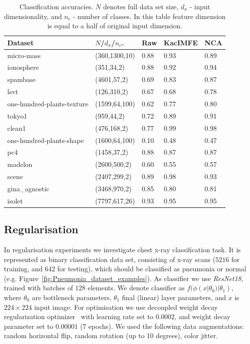 \documentclass{article}
\begin{document}
\begin{table}	
	\centering
	\begin{tabular}{ |p{3cm}|p{2.0cm}|p{1.2cm}|p{1.7cm}|p{1.2cm}|  }
		\hline
		Dataset & $N$/$d_{x}$/$n_{c}$. & Raw & KacIMFE & NCA  \\
		\hline
		micro-mass  &  (360,1300,10)  &   0.88  &   0.93  &   0.89 \\
		ionosphere  &  (351,34,2)  &   0.88  &   0.92  &   0.94 \\
		spambase  &  (4601,57,2)  &   0.69  &   0.83  &   0.87 \\
		lsvt  &  (126,310,2)  &   0.67  &   0.68  &   0.78 \\		
		one-hundred-plants-texture  &  (1599,64,100)  &   0.62  &   0.77  &   0.80 \\
		tokyo1  &  (959,44,2)  &   0.72  &   0.89  &   0.91 \\				
		clean1  &  (476,168,2)  &   0.77  &   0.99  &   0.98 \\
		one-hundred-plants-shape  &  (1600,64,100)  &   0.10  &   0.48  &   0.47 \\	
		pc4  &  (1458,37,2)  &   0.88  &   0.87  &   0.87 \\
		madelon  &  (2600,500,2)  &   0.60  &   0.55  &   0.57 \\
		scene  &  (2407,299,2)  &   0.89  &   0.98  &   0.93 \\
		gina\_agnostic  &  (3468,970,2)  &   0.85  &   0.80  &   0.81 \\
		isolet  &  (7797,617,26)  &   0.93  &   0.95  &   0.95 \\			
								
		\hline
	\end{tabular}
	\caption{Classification accuracies. $N$ denotes full data set size, $d_{x}$ - input dimensionality, and $n_{c}$ - number of classes. In this table feature dimension is equal to a half of original input dimension.}
	\label{table:classification_accuracies}	
\end{table}



\subsection{Regularisation}
In regularisation experiments we investigate chest x-ray classification task. It is represented as binary classification data set, consisting of x-ray scans ($5216$ for training, and $642$ for testing), which should be classified as pneumonia or normal (e.g. Figure~\ref{fig:Pneumonia_dataset_examples}). As classifier we use \emph{ResNet18}, trained with batches of $128$ elements.
We denote classifier as $f(\phi(x|\theta_{0})|\theta_{1})$, where $\theta_{0}$ are bottleneck parameters, $\theta_{1}$ final (linear) layer parameters, and $x$ is $224\times 224$ input image.
For optimisation we use decoupled weight decay regularization optimizer~\cite{Loshchilov2019DecoupledWD} with learning rate set to $0.0002$, and weight decay parameter set to $0.00001$ ($7$ epochs).
We used the following data augmentations: random horizontal flip, random rotation (up to 10 degrees), color jitter.
 
\end{document}
